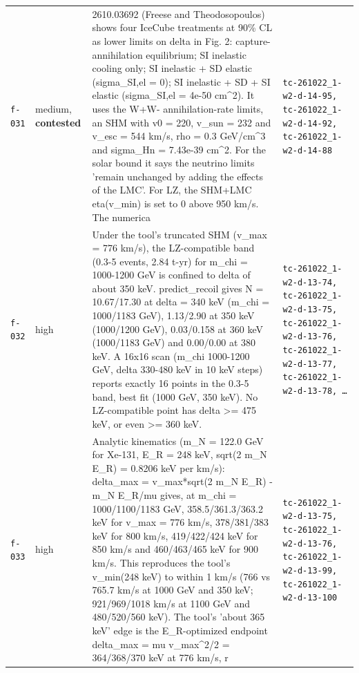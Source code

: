 \documentclass[11pt,a4paper]{article}
\begin{document}
\begin{longtable}{@{}p{}p{}p{}p{}@{}}
\texttt{f-031} & medium, \textbf{contested} & 2610.03692 (Freese and Theodosopoulos) shows four IceCube treatments at 90\% CL as lower limits on delta in Fig. 2: capture-annihilation equilibrium; SI inelastic cooling only; SI inelastic + SD elastic (sigma\_SI,el = 0); SI inelastic + SD + SI elastic (sigma\_SI,el = 4e-50 cm\textasciicircum{}2). It uses the W+W- annihilation-rate limits, an SHM with v0 = 220, v\_sun = 232 and v\_esc = 544 km/s, rho = 0.3 GeV/cm\textasciicircum{}3 and sigma\_Hn = 7.43e-39 cm\textasciicircum{}2. For the solar bound it says the neutrino limits 'remain unchanged by adding the effects of the LMC'. For LZ, the SHM+LMC eta(v\_min) is set to 0 above 950 km/s. The numerica & \texttt{tc-261022\_\allowbreak{}1-w2-d-14-95,\allowbreak{} tc-261022\_\allowbreak{}1-w2-d-14-92,\allowbreak{} tc-261022\_\allowbreak{}1-w2-d-14-88} \\
\texttt{f-032} & high & Under the tool's truncated SHM (v\_max = 776 km/s), the LZ-compatible band (0.3-5 events, 2.84 t-yr) for m\_chi = 1000-1200 GeV is confined to delta of about 350 keV. predict\_recoil gives N = 10.67/17.30 at delta = 340 keV (m\_chi = 1000/1183 GeV), 1.13/2.90 at 350 keV (1000/1200 GeV), 0.03/0.158 at 360 keV (1000/1183 GeV) and 0.00/0.00 at 380 keV. A 16x16 scan (m\_chi 1000-1200 GeV, delta 330-480 keV in 10 keV steps) reports exactly 16 points in the 0.3-5 band, best fit (1000 GeV, 350 keV). No LZ-compatible point has delta \textgreater{}= 475 keV, or even \textgreater{}= 360 keV. & \texttt{tc-261022\_\allowbreak{}1-w2-d-13-74,\allowbreak{} tc-261022\_\allowbreak{}1-w2-d-13-75,\allowbreak{} tc-261022\_\allowbreak{}1-w2-d-13-76,\allowbreak{} tc-261022\_\allowbreak{}1-w2-d-13-77,\allowbreak{} tc-261022\_\allowbreak{}1-w2-d-13-78,\allowbreak{} \ldots{}\allowbreak{}} \\
\texttt{f-033} & high & Analytic kinematics (m\_N = 122.0 GeV for Xe-131, E\_R = 248 keV, sqrt(2 m\_N E\_R) = 0.8206 keV per km/s): delta\_max = v\_max*sqrt(2 m\_N E\_R) - m\_N E\_R/mu gives, at m\_chi = 1000/1100/1183 GeV, 358.5/361.3/363.2 keV for v\_max = 776 km/s, 378/381/383 keV for 800 km/s, 419/422/424 keV for 850 km/s and 460/463/465 keV for 900 km/s. This reproduces the tool's v\_min(248 keV) to within 1 km/s (766 vs 765.7 km/s at 1000 GeV and 350 keV; 921/969/1018 km/s at 1100 GeV and 480/520/560 keV). The tool's 'about 365 keV' edge is the E\_R-optimized endpoint delta\_max = mu v\_max\textasciicircum{}2/2 = 364/368/370 keV at 776 km/s, r & \texttt{tc-261022\_\allowbreak{}1-w2-d-13-75,\allowbreak{} tc-261022\_\allowbreak{}1-w2-d-13-76,\allowbreak{} tc-261022\_\allowbreak{}1-w2-d-13-99,\allowbreak{} tc-261022\_\allowbreak{}1-w2-d-13-100} \\

\end{longtable}
\end{document}
